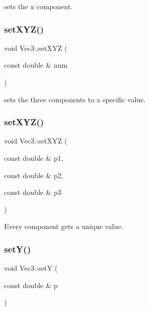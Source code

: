 sets the x component. 

\mbox{\label{classVec3_a36ab02d30acfd240bbc258f60ee69159}} 
\subsubsection{\texorpdfstring{set\+X\+Y\+Z()}{setXYZ()}\hspace{0.1cm}{\footnotesize\ttfamily [1/2]}}
{\footnotesize\ttfamily void Vec3\+::set\+X\+YZ (\begin{DoxyParamCaption}\item[{const double \&}]{num }\end{DoxyParamCaption})\hspace{0.3cm}{\ttfamily [inline]}}



sets the three components to a specific value. 

\mbox{\label{classVec3_a4905f9155ba4489cd41dc76f1c8a38d2}} 
\subsubsection{\texorpdfstring{set\+X\+Y\+Z()}{setXYZ()}\hspace{0.1cm}{\footnotesize\ttfamily [2/2]}}
{\footnotesize\ttfamily void Vec3\+::set\+X\+YZ (\begin{DoxyParamCaption}\item[{const double \&}]{p1,  }\item[{const double \&}]{p2,  }\item[{const double \&}]{p3 }\end{DoxyParamCaption})\hspace{0.3cm}{\ttfamily [inline]}}



Every component gets a unique value. 

\mbox{\label{classVec3_a51325493ea6f91ef0fc5234d314dc9ee}} 
\subsubsection{\texorpdfstring{set\+Y()}{setY()}}
{\footnotesize\ttfamily void Vec3\+::setY (\begin{DoxyParamCaption}\item[{const double \&}]{p }\end{DoxyParamCaption})\hspace{0.3cm}{\ttfamily [inline]}}



